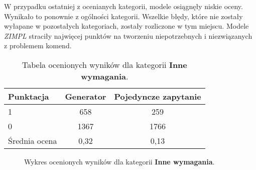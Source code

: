 W przypadku ostatniej z ocenianych kategorii, modele osiągnęły niskie oceny. Wynikało to ponownie z ogólności kategorii. Wszelkie błędy, które nie zostały wyłapane w pozostałych kategoriach, zostały rozliczone w tym miejscu. Modele  \textit{ZIMPL} straciły najwięcej punktów na tworzeniu niepotrzebnych i niezwiązanych z problemem komend. 

\begin{table}[ht]
\caption{Tabela ocenionych wyników dla kategorii \textbf{Inne wymagania}.}\label{tab:tabela22}
\centering%
\begin{tabular}{|l|c|c|}
\hline
\textbf{Punktacja} & \textbf{Generator} & \textbf{Pojedyncze zapytanie}\\
\hline
1 & 658 & 259 \\
\hline
0 & 1367 & 1766 \\
\hline
Średnia ocena & 0,32 & 0,13 \\
\hline
\end{tabular}
\end{table}


\begin{figure}[H]
\centering
\begin{minipage}{0.45\textwidth}
\centering
{}
\end{minipage}%
\hspace{0.05\textwidth}
\begin{minipage}{0.45\textwidth}
\centering
{}
\end{minipage}
\caption{Wykres ocenionych wyników dla kategorii \textbf{Inne wymagania}.}
\end{figure}

